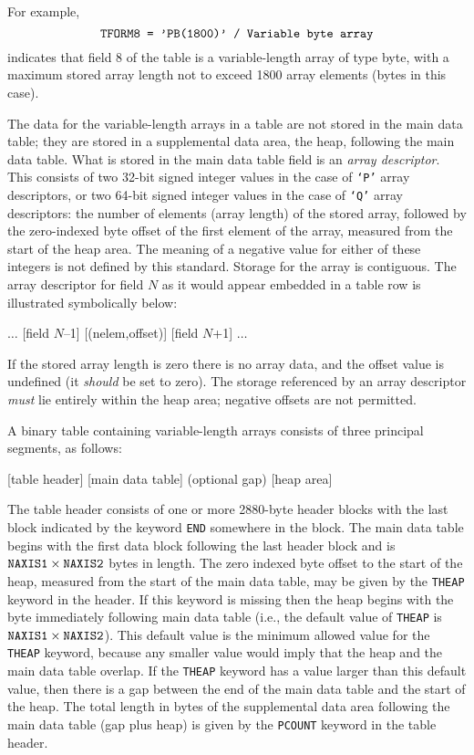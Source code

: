 \documentclass[11pt,makeidx]{book}     %
\begin{document}
For example,
\[\mbox{{\tt TFORM8  = 'PB(1800)'   / Variable byte array}} \]
indicates that field 8 of the table is a variable-length array of type
byte, with a maximum stored array length not to exceed 1800 array
elements (bytes in this case).

The data for the variable-length arrays in a table are not stored in
the main data table; they are stored in a supplemental data area, the
heap, following the main data table. 
What is stored in
the main data table field is an {\em array descriptor}.  This consists of two
32-bit signed integer values in the case of {\tt `P'} array descriptors,
or two 64-bit signed integer values in the case of {\tt `Q'} array
descriptors: the number of elements (array length) of the
stored array, followed by the zero-indexed byte offset of the first
element of the array, measured from the start of the heap area.
The meaning of a negative value for either of these integers is not
defined by this standard.
Storage for the array is contiguous.  The array descriptor for field
$N$ as it would appear embedded in a table row is illustrated
symbolically below:

\begin{center}
$\ldots$ [field $N$--1] [(nelem,offset)] [field $N$+1] $\ldots$
\end{center}

If the stored array length is zero there is no array data, and the
offset value is undefined 
(it {\em should} be set to zero).  The storage
referenced by an array descriptor {\em must} lie entirely within the heap
area; negative offsets are not permitted.

A binary table containing variable-length arrays consists of three
principal segments, as follows:

\begin{center}
[table header] [main data table] (optional gap) [heap area]
\end{center}

The table header consists of one or more 2880-byte header blocks with the
last block indicated by the  keyword {\tt END} somewhere in
the block.  The main data table begins with the first data block
following the last header block and is $\mbox{\tt NAXIS1} \times
\mbox{\tt NAXIS2}$ bytes in length.   The
zero indexed byte offset to the start of the heap, measured
from the start of the main data table, may be given by the {\tt THEAP}
keyword in the header.   If this keyword is missing then the
heap begins with the byte immediately following main data table (i.e.,
the default value of  {\tt THEAP} is $\mbox{\tt NAXIS1} \times \mbox{\tt
NAXIS2}$). This default value is the minimum allowed value for the {\tt
THEAP} keyword, because any smaller value would imply that the heap and the main
data table overlap. If the {\tt THEAP} keyword has a value larger than
this default value, then there is a  gap between the end of the main data
table and the start of the heap.   The total length in bytes of the
supplemental data area following the main data table (gap plus heap) is
given by the {\tt PCOUNT} keyword in the table header.
\end{document}
